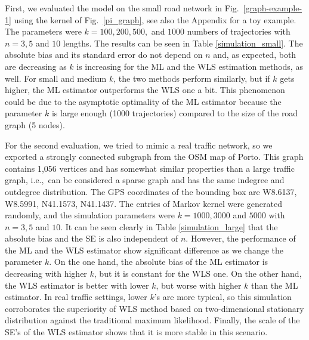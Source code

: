 \documentclass[b5paper,12pt]{report}
\theoremstyle{definition}
\begin{document}
First, we evaluated the model on the small road network in Fig.~\ref{graph-example-1} using the kernel of Fig.~\ref{pi_graph}, see also the Appendix for a toy example. The parameters were $k=100,200,500,$ and $1000$ numbers of trajectories with $n=3,5$ and $10$ lengths. The results can be seen in Table \ref{simulation_small}. The absolute bias and its standard error do not depend on $n$ and, as expected, both are decreasing as $k$ is increasing for the ML and the WLS estimation methods, as well. For small and medium $k$, the two methods perform similarly, but if $k$ gets higher, the ML estimator outperforms the WLS one a bit. This phenomenon could be due to the asymptotic optimality of the ML estimator because the parameter $k$ is large enough (1000 trajectories) compared to the size of the road graph (5 nodes).

For the second evaluation, we tried to mimic a real traffic network, so we exported a strongly connected subgraph from the OSM map of Porto. This graph contains 1,056 vertices and has somewhat similar properties than a large traffic graph, i.e.,~can be considered a sparse graph and has the same indegree and outdegree distribution. The GPS coordinates of the bounding box are W8.6137, W8.5991, N41.1573, N41.1437. The entries of Markov kernel were generated randomly, and the simulation parameters were $k=1000,3000$ and $5000$ with $n=3,5$ and $10$. It can be seen clearly in Table \ref{simulation_large} that the absolute bias and the SE is also independent of $n$. However, the performance of the ML and the WLS estimator show significant difference as we change the parameter $k$. On the one hand, the absolute bias of the ML estimator is decreasing with higher $k$, but it is constant for the WLS one. On the other hand, the WLS estimator is better with lower $k$, but worse with higher $k$ than the ML estimator. In real traffic settings, lower $k$'s are more typical, so this simulation corroborates the superiority of WLS method based on two-dimensional stationary distribution against the traditional maximum likelihood. Finally, the scale of the SE's of the WLS estimator shows that it is more stable in this scenario.
\end{document}
